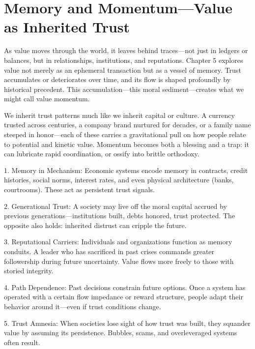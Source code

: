 \documentclass[11pt,oneside]{book}
\begin{document}
\section{Memory and Momentum—Value as Inherited Trust}

As value moves through the world, it leaves behind traces—not just in ledgers or balances, but in relationships, institutions, and reputations. Chapter 5 explores value not merely as an ephemeral transaction but as a vessel of memory. Trust accumulates or deteriorates over time, and its flow is shaped profoundly by historical precedent. This accumulation—this moral sediment—creates what we might call value momentum.

We inherit trust patterns much like we inherit capital or culture. A currency trusted across centuries, a company brand nurtured for decades, or a family name steeped in honor—each of these carries a gravitational pull on how people relate to potential and kinetic value. Momentum becomes both a blessing and a trap: it can lubricate rapid coordination, or ossify into brittle orthodoxy.


1. Memory in Mechanism: Economic systems encode memory in contracts, credit histories, social norms, interest rates, and even physical architecture (banks, courtrooms). These act as persistent trust signals.



2. Generational Trust: A society may live off the moral capital accrued by previous generations—institutions built, debts honored, trust protected. The opposite also holds: inherited distrust can cripple the future.



3. Reputational Carriers: Individuals and organizations function as memory conduits. A leader who has sacrificed in past crises commands greater followership during future uncertainty. Value flows more freely to those with storied integrity.



4. Path Dependence: Past decisions constrain future options. Once a system has operated with a certain flow impedance or reward structure, people adapt their behavior around it—even if trust conditions change.



5. Trust Amnesia: When societies lose sight of how trust was built, they squander value by assuming its persistence. Bubbles, scams, and overleveraged systems often result.
\end{document}
